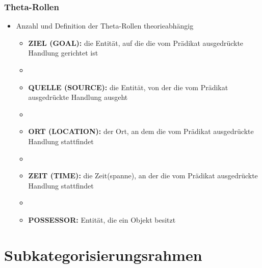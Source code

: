 \begin{frame}
\frametitle{Theta-Rollen}

\begin{itemize}
	\item Anzahl und Definition der Theta-Rollen \ras theorieabhängig
	
	\begin{itemize}

		\item \textbf{ZIEL (GOAL):} die Entität, auf die die vom Prädikat ausgedrückte Handlung gerichtet ist

		\item[]
		\item \textbf{QUELLE (SOURCE):} die Entität, von der die vom Prädikat ausgedrückte Handlung ausgeht

		\item[]
		\item \textbf{ORT (LOCATION):} der Ort, an dem die vom Prädikat ausgedrückte Handlung stattfindet

		\item[]
		\item \textbf{ZEIT (TIME):} die Zeit(spanne), an der die vom Prädikat ausgedrückte Handlung stattfindet

		\item[]
		\item \textbf{POSSESSOR:} Entität, die ein Objekt besitzt		
	\end{itemize}

\end{itemize}

\end{frame}


\section{Subkategorisierungsrahmen}

